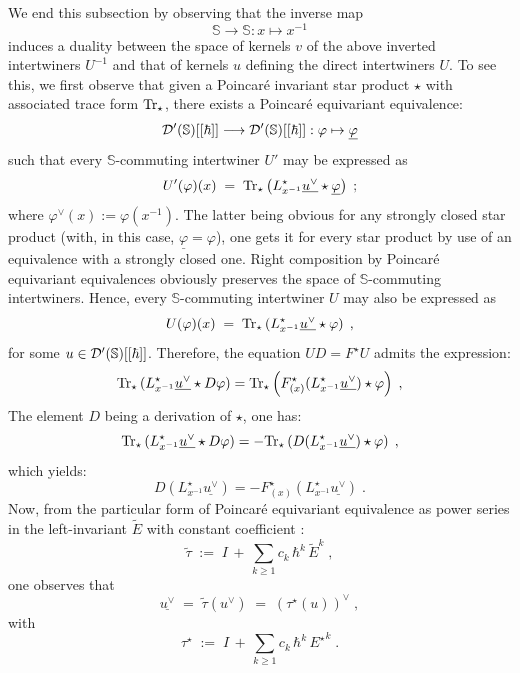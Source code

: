\documentclass{article}
\renewcommand{\SS}{\mathbb S}
\def\cd{{\cal D}}
\def\cd{{\cal D}}
\begin{document}
\noindent We end this subsection by observing that the inverse map
\begin{equation}
\SS\longrightarrow\SS:x\mapsto x^{-1}
\end{equation}
induces a duality between the space of kernels $v$ of the above inverted intertwiners $U^{-1}$ and that 
of kernels $u$ defining the direct intertwiners $U$. To see this, we first observe that
given a Poincar\'e invariant star product $\star$ with associated trace form $\mbox{\rm Tr}_\star$, 
there exists a Poincar\'e equivariant equivalence:
\begin{equation}
\cd'(\SS)[[\hbar]]\longrightarrow\cd'(\SS)[[\hbar]]:\varphi\mapsto\underline{\varphi}
\end{equation}
such that every $\SS$-commuting intertwiner $U'$ may be expressed as
\begin{equation}
U'(\varphi)(x)\;=\;\mbox{\rm Tr}_\star\left(L_{x^{-1}}^\star\underline{u^\vee}\star\underline{\varphi}\right)\;;
\end{equation}
where $\varphi^\vee(x):=\varphi(x^{-1})$.
The latter being obvious for any strongly closed star product (with, in this case, $\underline{\varphi}=\varphi$), one gets it for every star product by use of an equivalence
with a strongly closed one. Right composition by Poincar\'e equivariant equivalences obviously preserves the space of $\SS$-commuting intertwiners. Hence, every $\SS$-commuting intertwiner $U$ may also be expressed as
\begin{equation}
U(\varphi)(x)\;=\;\mbox{\rm Tr}_\star\left(L_{x^{-1}}^\star\underline{u^\vee}\star\varphi\right)\;,
\end{equation}
for some $u\in\cd'(\SS)[[\hbar]]$.
\noindent Therefore, the equation $UD=F^\star U$ admits the expression:
\begin{equation}
\mbox{\rm Tr}_\star\left(L_{x^{-1}}^\star\underline{u^\vee}\star D\varphi\right)=\mbox{\rm Tr}_\star\left(F^\star_{(x)}(L_{x^{-1}}^\star\underline{u^\vee})\star \varphi\right)\;,
\end{equation}
The element $D$ being a derivation of $\star$, one has:
\begin{equation}
\mbox{\rm Tr}_\star\left(L_{x^{-1}}^\star\underline{u^\vee}\star D\varphi\right)=-
\mbox{\rm Tr}_\star\left(D(L_{x^{-1}}^\star\underline{u^\vee})\star \varphi\right)\;,
\end{equation}
which yields:
\begin{equation}
{D}(L_{x^{-1}}^\star\underline{u^\vee})=-F^\star_{(x)}(L_{x^{-1}}^\star\underline{u^\vee})\;.
\end{equation}
Now, from the particular form of Poincar\'e equivariant equivalence as power series
in the left-invariant $\tilde{E}$ with constant coefficient \cite{Bi07}:
\begin{equation}
\tilde{\tau}\;:=\;I\,+\,\sum_{k\geq1}c_k\,\hbar^k\,\tilde{E}^k\;,
\end{equation}
 one observes that
\begin{equation}
\underline{u^\vee}\;=\;\tilde{\tau}(u^\vee)\;=\;(\tau^\star(u))^\vee\;,
\end{equation}
with 
\begin{equation}
\tau^\star\;:=\;I\,+\,\sum_{k\geq1}c_k\,\hbar^k\,{E^\star}^k\;.
\end{equation}
\end{document}
